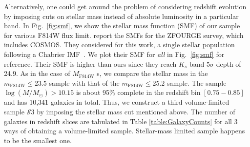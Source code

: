 \documentclass[twocolumn,useAMS,usenatbib]{mn2e}
\newcommand{\s}{\ensuremath{\mathcal{S}}}
\begin{document}


Alternatively, one could get around the problem of considering redshift evolution by imposing cuts on stellar mass instead of absolute luminosity in a particular band. In Fig.~\ref{fig:smf}, we show the stellar mass function (SMF) of our sample for various F814W flux limit.
\cite{Tomczak_SMF} report the SMFs for the ZFOURGE survey, which includes COSMOS. They considered for this work, a single stellar population following a Chabrier IMF~\citep{ChabrierIMF}. 
We plot their SMF for \emph{all} in Fig.~\ref{fig:smf} for
reference. Their SMF is higher than ours since they reach $K_s$-band
$5\sigma$ depth of 24.9. 
As in the case of $M_\text{F814W}$ s, we compare the stellar mass in the $m_\text{F814W}\le23.5$ sample with that of the $m_\text{F814W}\le25.2$ sample. 
The sample $\log(M/M_\odot) > 10.15$ is about 95\% complete in the redshift bin $\left[ 0.75 - 0.85\right]$ and has 10,341 galaxies in total.
Thus, we construct a third volume-limited sample \s$3$ by imposing the stellar mass cut mentioned above. The number of galaxies in redshift slices
are tabulated in Table \ref{table:GalaxyCounts} for all 3 ways of obtaining a volume-limited sample. Stellar-mass limited sample happens to be the smallest one.
\end{document}
